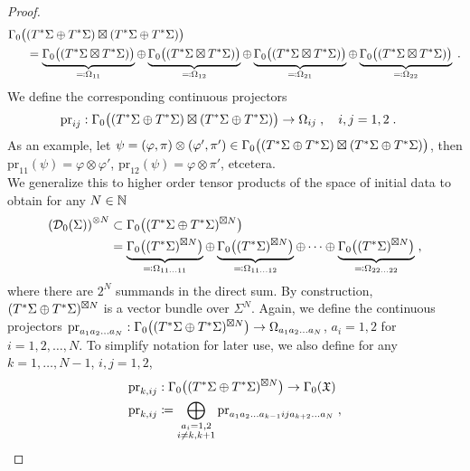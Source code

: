 \begin{proof}
\begin{align}
\Gamma_0\big( &(T^*\Sigma \oplus T^*\Sigma) \boxtimes (T^*\Sigma \oplus T^*\Sigma) \big)\notag \\
  &= \underbrace{\Gamma_0\big( (T^*\Sigma \boxtimes T^*\Sigma) \big) }_{\eqqcolon \Omega_{11}} \oplus \underbrace{\Gamma_0\big( (T^*\Sigma \boxtimes T^*\Sigma) \big) }_{\eqqcolon \Omega_{12}}  \oplus \underbrace{\Gamma_0\big( (T^*\Sigma \boxtimes T^*\Sigma) \big)}_{\eqqcolon \Omega_{21}}    \oplus \underbrace{\Gamma_0\big( (T^*\Sigma \boxtimes T^*\Sigma) \big)   }_{\eqqcolon \Omega_{22}}  \;.
\end{align}
We define the corresponding continuous projectors
\begin{align}
	\text{pr}_{ij} : \Gamma_0\big( &(T^*\Sigma \oplus T^*\Sigma) \boxtimes (T^*\Sigma \oplus T^*\Sigma) \big) \to \Omega_{ij} \;,\quad i,j=1,2 \;.
\end{align}
As an example, let $\psi = (\varphi, \pi) \otimes (\varphi',\pi') \in \Gamma_0\big( (T^*\Sigma \oplus T^*\Sigma) \boxtimes (T^*\Sigma \oplus T^*\Sigma) \big)$, then $\text{pr}_{11}(\psi) = \varphi \otimes \varphi'$, $\text{pr}_{12}(\psi) = \varphi \otimes \pi'$, etcetera.\\
We generalize this to higher order tensor products of the space of initial data to obtain for any $N \in \mathbb{N}$
\begin{align}
	\left(\mathcal{D}_{0}(\Sigma)\right)^{\otimes N}
	&\subset \Gamma_0\big( (T^*\Sigma \oplus T^*\Sigma)^{\boxtimes N} \big) \notag\\
	 &= \underbrace{\Gamma_0\big( (T^*\Sigma)^{\boxtimes N} \big) }_{\eqqcolon \Omega_{11\dots11}} \oplus \underbrace{\Gamma_0\big( (T^*\Sigma)^{\boxtimes N} \big) }_{\eqqcolon \Omega_{11\dots12}}  \oplus \cdots \oplus \underbrace{\Gamma_0\big( (T^*\Sigma)^{\boxtimes N} \big)   }_{\eqqcolon \Omega_{22\dots22}} \;,
\end{align}
where there are $2^N$ summands in the direct sum. By construction, $ (T^*\Sigma \oplus T^*\Sigma)^{\boxtimes N}$ is a vector bundle over $\Sigma^N$. Again, we define the continuous projectors $\text{pr}_{a_1 a_2 \dots a_N} : \Gamma_0\big( (T^*\Sigma \oplus T^*\Sigma)^{\boxtimes N} \big) \to \Omega_{a_1 a_2 \dots a_N}$, $a_i = 1, 2$ for $i=1,2,\dots,N$. To simplify notation for later use, we also define for any $k=1,\dots,N-1$, $i,j=1,2$,
\begin{align}
	\text{pr}_{k,ij} &:  \Gamma_0\big( (\TsS \oplus \TsS)^{\boxtimes N} \big) \to  \Gamma_0(\mathfrak{X}) \notag \\
	\text{pr}_{k,ij} &\coloneqq \bigoplus\limits_{\substack{a_i = 1,2 \\ i \neq k,k+1}} \text{pr}_{a_1 a_2 \dots a_{k-1} i j a_{k+2} \dots a_N}  \formspace,

\end{align}
\end{proof}
